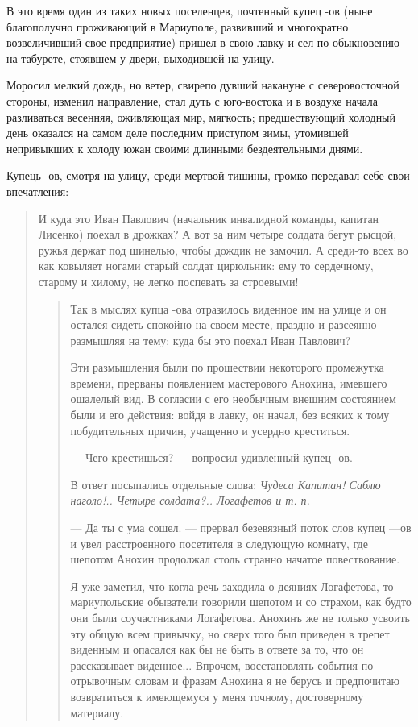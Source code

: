 В это время один из таких новых поселенцев,
почтенный купец -ов (ныне благополучно проживающий
в Мариуполе, развивший и многократно возвеличивший свое
предприятие) пришел в свою лавку и сел по обыкновению
на табурете, стоявшем у двери, выходившей на улицу. 

Моросил мелкий дождь, но ветер, свирепо дувший накануне с северовосточной
стороны, изменил направление, стал дуть с юго-востока и в воздухе начала
разливаться весенняя, оживляющая мир, мягкость; предшествующий холодный день
оказался на самом деле последним приступом зимы, утомившей непривыкших к холоду
южан своими длинными бездеятельными днями.

Купець -ов, смотря на улицу, среди мертвой тишины, 
громко передавал себе свои впечатления: 

\begin{quote}
\em\bfseries

И куда это
Иван Павлович (начальник инвалидной команды, капитан Лисенко) поехал в дрожках?
А вот за ним четыре солдата бегут рысцой, ружья держат под шинелью, чтобы дождик не замочил. А среди-то всех во как
ковыляет ногами старый солдат цирюльник: ему то сердечному, старому и хилому, не легко поспевать за строевыми!
\begin{quote}

Так в мыслях купца -ова отразилось виденное
им на улице и он осталея сидеть спокойно на своем
месте, праздно и разсеянно размышляя на тему: куда бы это
поехал Иван Павлович?

Эти размышления были по прошествии некоторого промежутка времени, прерваны появлением мастерового 
Анохина, имевшего ошалелый вид. В согласии с его необычным внешним состоянием были и его действия: войдя в лавку, 
		он начал, без всяких к тому побудительных причин, учащенно и усердно креститься.

— Чего крестишься? — вопросил удивленный купец -ов.

В ответ посыпались отдельные слова: \emph{Чудеса Капитан! Саблю наголо!..
Четыре солдата?.. Логафетов и т. п.}

— Да ты с ума сошел. — прервал безевязный поток слов купец —ов и увел расстроенного 
посетителя в следующую комнату, где шепотом Анохин продолжал столь странно начатое  
повествование.

Я уже заметил, что когла речь заходила о деяниях Логафетова, то мариупольские
обыватели говорили шепотом и со страхом, как будто они были
соучастниками Логафетова. Анохинъ же не только усвоить эту общую всем
привычку, но сверх того был приведен в трепет виденным и опасался как
бы не быть в ответе за то, что он рассказывает виденное... Впрочем,
восстановлять события по отрывочным словам и фразам Анохина я не берусь
и предпочитаю возвратиться к имеющемуся у меня точному, достоверному
материалу.


\end{quote}
\end{quote}
